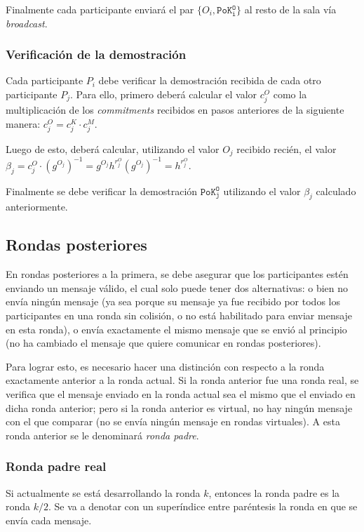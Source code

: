 Finalmente cada participante enviará el par $\{O_i, \mathtt{PoK_i^O}\}$ al resto de 
la sala vía \emph{broadcast}.

\subsubsection{Verificación de la demostración}

Cada participante $P_i$ debe verificar la demostración recibida de cada otro 
participante $P_j$. Para ello, primero deberá calcular el valor $c_j^O$ como la 
multiplicación de los \emph{commitments} recibidos en pasos anteriores de la 
siguiente manera: $c_j^O = c_j^K \cdot c_j^M$.

Luego de esto, deberá calcular, utilizando el valor $O_j$ recibido recién, el 
valor $\beta_j = c_j^O \cdot (g^{O_j})^{-1} = g^{O_j} h^{r_j^O} (g^{O_j})^{-1} = h^{r_j^O}$.

Finalmente se debe verificar la demostración $\mathtt{PoK_j^O}$ utilizando el 
valor $\beta_j$ calculado anteriormente.

\subsection{Rondas posteriores}

En rondas posteriores a la primera, se debe asegurar que los participantes estén 
enviando un mensaje válido, el cual solo puede tener dos alternativas: o bien no envía 
ningún mensaje (ya sea porque su mensaje ya fue recibido por todos los participantes 
en una ronda sin colisión, o no está habilitado para enviar mensaje en esta ronda), o 
envía exactamente el mismo mensaje que se envió al principio (no ha cambiado el mensaje 
que quiere comunicar en rondas posteriores).

Para lograr esto, es necesario hacer una distinción con respecto a la ronda exactamente 
anterior a la ronda actual. Si la ronda anterior fue una ronda real, se verifica que 
el mensaje enviado en la ronda actual sea el mismo que el enviado en dicha ronda anterior; 
pero si la ronda anterior es virtual, no hay ningún mensaje con el que comparar 
(no se envía ningún mensaje en rondas virtuales). A esta ronda anterior se le 
denominará \emph{ronda padre}.

\subsubsection{Ronda padre real}

Si actualmente se está desarrollando la ronda $k$, entonces la ronda padre es la 
ronda $k/2$. Se va a denotar con un superíndice entre paréntesis la ronda en que 
se envía cada mensaje.

